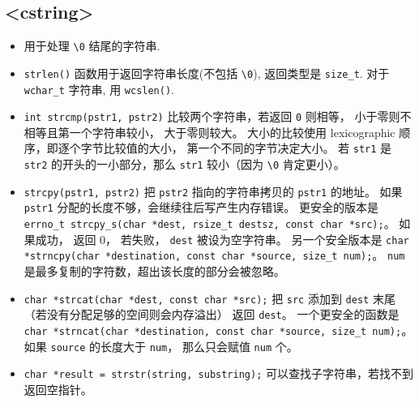 \subsection{<cstring>}
\begin{itemize}
\item 用于处理 \verb`\0` 结尾的字符串.
\item \verb`strlen()` 函数用于返回字符串长度(不包括 \verb`\0`), 返回类型是 \verb`size_t`. 对于 \verb`wchar_t` 字符串, 用 \verb`wcslen()`.
\item \verb`int strcmp(pstr1, pstr2)` 比较两个字符串，若返回 \verb`0` 则相等， 小于零则不相等且第一个字符串较小， 大于零则较大。 大小的比较使用 lexicographic 顺序，即逐个字节比较值的大小， 第一个不同的字节决定大小。 若 \verb`str1` 是 \verb`str2` 的开头的一小部分，那么 \verb`str1` 较小（因为 \verb`\0` 肯定更小）。
\item \verb`strcpy(pstr1, pstr2)` 把 \verb`pstr2` 指向的字符串拷贝的 \verb`pstr1` 的地址。 如果 \verb`pstr1` 分配的长度不够，会继续往后写产生内存错误。 更安全的版本是 \verb`errno_t strcpy_s(char *dest, rsize_t destsz, const char *src);`。 如果成功， 返回 0， 若失败， \verb`dest` 被设为空字符串。 另一个安全版本是 \verb`char *strncpy(char *destination, const char *source, size_t num);`。 \verb`num` 是最多复制的字符数，超出该长度的部分会被忽略。
\item \verb`char *strcat(char *dest, const char *src);` 把 \verb`src` 添加到 \verb`dest` 末尾（若没有分配足够的空间则会内存溢出） 返回 \verb`dest`。 一个更安全的函数是 \verb`char *strncat(char *destination, const char *source, size_t num);`。 如果 \verb`source` 的长度大于 \verb`num`， 那么只会赋值 \verb`num` 个。
\item \verb`char *result = strstr(string, substring);` 可以查找子字符串，若找不到返回空指针。
\end{itemize}

